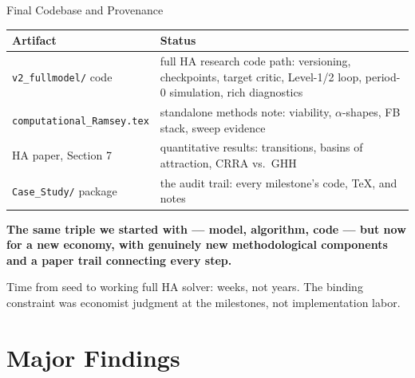 \documentclass[10pt,aspectratio=169]{beamer}
\newcommand{\compacttables}{\renewcommand{\arraystretch}{1.15}}
\begin{document}
\begin{frame}{Final Codebase and Provenance}
\compacttables
\begin{center}\footnotesize
\begin{tabular}{p{4.2cm}p{7.7cm}}
\toprule
\textbf{Artifact} & \textbf{Status} \\
\midrule
\texttt{v2\_fullmodel/} code & full HA research code path: versioning, checkpoints, target critic, Level-1/2 loop, period-0 simulation, rich diagnostics \\
\texttt{computational\_Ramsey.tex} & standalone methods note: viability, $\alpha$-shapes, FB stack, sweep evidence \\
HA paper, Section 7 & quantitative results: transitions, basins of attraction, CRRA vs.\ GHH \\
\texttt{Case\_Study/} package & the audit trail: every milestone's code, TeX, and notes \\
\bottomrule
\end{tabular}
\end{center}

\smallskip
{\small\textbf{The same triple we started with --- model, algorithm, code --- but now for a new economy, with genuinely new methodological components and a paper trail connecting every step.}}

\smallskip
\begin{block}{}
\small Time from seed to working full HA solver: weeks, not years. The binding constraint
was economist judgment at the milestones, not implementation labor.
\end{block}
\end{frame}

\section{Major Findings}
\end{document}
